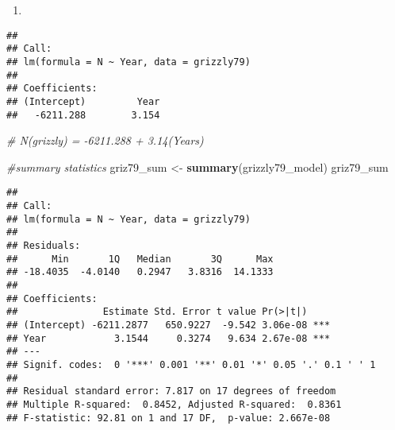 \documentclass[]{article}
\newenvironment{Shaded}{\begin{snugshade}}{\end{snugshade}}
\newcommand{\KeywordTok}[1]{\textcolor[rgb]{0.13,0.29,0.53}{\textbf{#1}}}
\newcommand{\DataTypeTok}[1]{\textcolor[rgb]{0.13,0.29,0.53}{#1}}
\newcommand{\StringTok}[1]{\textcolor[rgb]{0.31,0.60,0.02}{#1}}
\newcommand{\CommentTok}[1]{\textcolor[rgb]{0.56,0.35,0.01}{\textit{#1}}}
\newcommand{\OperatorTok}[1]{\textcolor[rgb]{0.81,0.36,0.00}{\textbf{#1}}}
\newcommand{\NormalTok}[1]{#1}
\begin{document}
\begin{enumerate}
\def\labelenumi{\arabic{enumi}.}
\setcounter{enumi}{7}
\item
\end{enumerate}

\begin{Shaded}
\end{Shaded}

\begin{verbatim}
## 
## Call:
## lm(formula = N ~ Year, data = grizzly79)
## 
## Coefficients:
## (Intercept)         Year  
##   -6211.288        3.154
\end{verbatim}

\begin{Shaded}
\begin{Highlighting}[]
\CommentTok{# N(grizzly) = -6211.288 + 3.14(Years)}

\CommentTok{#summary statistics}
\NormalTok{griz79_sum <-}\StringTok{ }\KeywordTok{summary}\NormalTok{(grizzly79_model)}
\NormalTok{griz79_sum}
\end{Highlighting}
\end{Shaded}

\begin{verbatim}
## 
## Call:
## lm(formula = N ~ Year, data = grizzly79)
## 
## Residuals:
##      Min       1Q   Median       3Q      Max 
## -18.4035  -4.0140   0.2947   3.8316  14.1333 
## 
## Coefficients:
##               Estimate Std. Error t value Pr(>|t|)    
## (Intercept) -6211.2877   650.9227  -9.542 3.06e-08 ***
## Year            3.1544     0.3274   9.634 2.67e-08 ***
## ---
## Signif. codes:  0 '***' 0.001 '**' 0.01 '*' 0.05 '.' 0.1 ' ' 1
## 
## Residual standard error: 7.817 on 17 degrees of freedom
## Multiple R-squared:  0.8452, Adjusted R-squared:  0.8361 
## F-statistic: 92.81 on 1 and 17 DF,  p-value: 2.667e-08
\end{verbatim}
\end{document}
